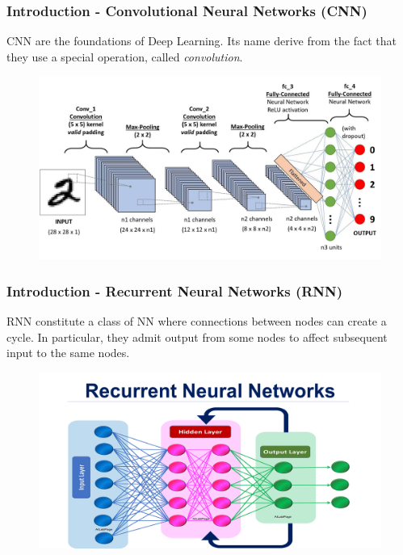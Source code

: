\documentclass{beamer}
\begin{document}
	\begin{frame}
		\frametitle{Introduction - Convolutional Neural Networks (CNN)}
		CNN are the foundations of Deep Learning. Its name derive from the fact that they use a special operation, called \textsl{convolution}.
		\begin{figure}
			\centering
			\includegraphics[scale=0.15]{images/cnn}
		\end{figure}
	\end{frame}

	\begin{frame}
		\frametitle{Introduction - Recurrent Neural Networks (RNN)}
		RNN constitute a class of NN where connections between nodes can create a cycle. In particular, they admit output from some nodes to affect subsequent input to the same nodes.
		\begin{figure}
			\centering
			\includegraphics[scale=0.20]{images/rnn}
		\end{figure}
	\end{frame}
	
\end{document}
